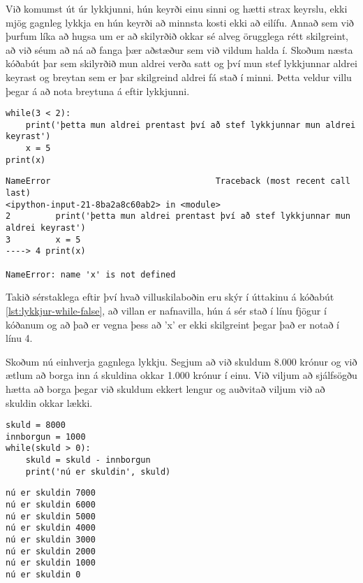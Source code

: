 Við komumst út úr lykkjunni, hún keyrði einu sinni og hætti strax keyrslu, ekki mjög gagnleg lykkja en hún keyrði að minnsta kosti ekki að eilífu.
Annað sem við þurfum líka að hugsa um er að skilyrðið okkar sé alveg örugglega rétt skilgreint, að við séum að ná að fanga þær aðstæður sem við vildum halda í.
Skoðum næsta kóðabút þar sem skilyrðið mun aldrei verða satt og því mun stef lykkjunnar aldrei keyrast og breytan sem er þar skilgreind aldrei fá stað í minni.
Þetta veldur villu þegar á að nota breytuna á eftir lykkjunni. 

\begin{lstlisting}[caption=while-lykkja sem keyrir aldrei, label=lst:lykkjur-while-false]
while(3 < 2):
	print('þetta mun aldrei prentast því að stef lykkjunnar mun aldrei keyrast')
	x = 5
print(x)
\end{lstlisting}
\lstset{style=uttak}
\begin{lstlisting}
NameError                                 Traceback (most recent call last)
<ipython-input-21-8ba2a8c60ab2> in <module>
2         print('þetta mun aldrei prentast því að stef lykkjunnar mun aldrei keyrast')
3         x = 5
----> 4 print(x)

NameError: name 'x' is not defined
\end{lstlisting}
\lstset{style=venjulegt}

Takið sérstaklega eftir því hvað villuskilaboðin eru skýr í úttakinu á kóðabút \ref{lst:lykkjur-while-false}, að villan er nafnavilla, hún á sér stað í línu fjögur í kóðanum og að það er vegna þess að 'x' er ekki skilgreint þegar það er notað í línu 4.

Skoðum nú einhverja gagnlega lykkju.
Segjum að við skuldum 8.000 krónur og við ætlum að borga inn á skuldina okkar 1.000 krónur í einu.
Við viljum að sjálfsögðu hætta að borga þegar við skuldum ekkert lengur og auðvitað viljum við að skuldin okkar lækki.

\begin{lstlisting}[caption=while-lykkja sem eitthvað vit er í, label=lst:lykkjur-while-skuld]
skuld = 8000
innborgun = 1000
while(skuld > 0):
	skuld = skuld - innborgun
	print('nú er skuldin', skuld)
\end{lstlisting}
\lstset{style=uttak}
\begin{lstlisting}
nú er skuldin 7000
nú er skuldin 6000
nú er skuldin 5000
nú er skuldin 4000
nú er skuldin 3000
nú er skuldin 2000
nú er skuldin 1000
nú er skuldin 0
\end{lstlisting}
\lstset{style=venjulegt}

